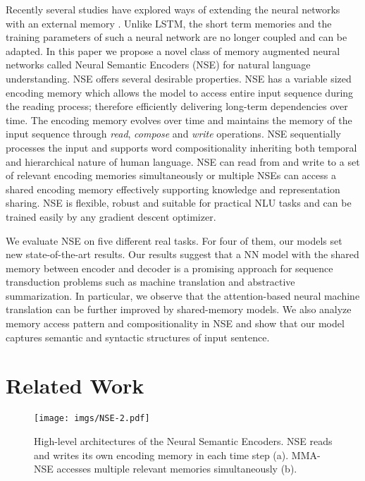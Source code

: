 \documentclass{article}
\begin{document}
Recently several studies have explored ways of extending the neural networks with an external memory \cite{graves2014neural,weston:15,grefenstette2015learning}. Unlike LSTM, the short term memories and the training parameters of such a neural network are no longer coupled and can be adapted. In this paper we propose a novel class of memory augmented neural networks called Neural Semantic Encoders (NSE) for natural language understanding. NSE offers several desirable properties. NSE has a variable sized encoding memory which allows the model to access entire input sequence during the reading process; therefore efficiently delivering long-term dependencies over time. The encoding memory evolves over time and maintains the memory of the input sequence through \textit{read}, \textit{compose} and \textit{write} operations. NSE sequentially processes the input and supports word compositionality inheriting both temporal and hierarchical nature of human language. NSE can read from and write to a set of relevant encoding memories simultaneously or multiple NSEs can access a shared encoding memory effectively supporting knowledge and representation sharing. NSE is flexible, robust and suitable for practical NLU tasks and can be trained easily by any gradient descent optimizer.


We evaluate NSE on five different real tasks. For four of them, our models set new state-of-the-art results. Our results suggest that a NN model with the shared memory between encoder and decoder is a promising approach for sequence transduction problems such as machine translation and abstractive summarization. In particular, we observe that the attention-based neural machine translation can be further improved by shared-memory models. We also analyze memory access pattern and compositionality in NSE and show that our model captures semantic and syntactic structures of input sentence. 

\section{Related Work}

\begin{figure*}[tp]
    \centering
        \texttt{[image: imgs/NSE-2.pdf]}
        \vspace*{-1.0cm}  
        \caption{\label{fig:skip-gram} High-level architectures of the Neural Semantic Encoders. NSE reads and writes its own encoding memory in each time step (a). MMA-NSE accesses multiple relevant memories simultaneously (b).}
        \label{figure:NSE}
\end{figure*}
\end{document}
